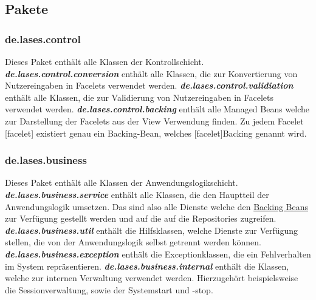 
\subsection{Pakete}\label{arch:pakete}

\subsubsection{de.lases.control} \label{arch:control}
Dieses Paket enthält alle Klassen der Kontrollschicht.
\newline\newline
\textbf{\emph{de.lases.control.conversion}}
enthält alle Klassen, die zur Konvertierung von Nutzereingaben
in Facelets verwendet werden.
\newline\newline
\textbf{\emph{de.lases.control.validiation}}
enthält alle Klassen, die zur Validierung von Nutzereingaben
in Facelets verwendet werden.
\newline\newline
\textbf{\emph{de.lases.control.backing}}\label{arch:backing}
enthält alle Managed Beans welche zur Darstellung der Facelets aus der
View Verwendung finden. Zu jedem Facelet [facelet] existiert genau ein
Backing-Bean, welches [facelet]Backing genannt wird.

\subsubsection{de.lases.business}\label{arch:business}
Dieses Paket enthält alle Klassen der Anwendungslogikschicht.
\newline\newline
\textbf{\emph{de.lases.business.service}}\label{arch:service}
enthält alle Klassen, die den Hauptteil der Anwendungslogik umsetzen.
Das sind also alle Dienste welche den
\hyperref[arch:backing]{Backing Beans} zur Verfügung
gestellt werden und auf die auf die %
Repositories zugreifen.
\newline\newline
\textbf{\emph{de.lases.business.util}}
enthält die Hilfsklassen, welche Dienste zur Verfügung stellen,
die von der Anwendungslogik selbst getrennt werden können.
\newline\newline
\textbf{\emph{de.lases.business.exception}} \label{arch:busex}
enthält die Exceptionklassen, die ein Fehlverhalten im System repräsentieren.
\newline\newline
\textbf{\emph{de.lases.business.internal}}
enthält die Klassen, welche zur internen Verwaltung verwendet werden.
Hierzugehört beispielsweise die Sessionverwaltung, sowie der Systemstart und -stop.

